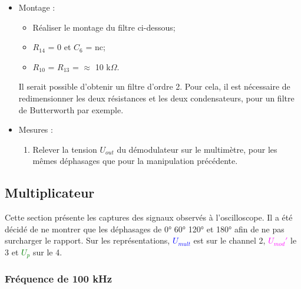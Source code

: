 \begin{itemize}
    \item Montage :
    \begin{itemize}
        \item Réaliser le montage du filtre ci-dessous;
        \item $R_{14}$ = 0 et $C_6$ = nc;
        \item $R_{10}$ = $R_{13}$ = $\approx$ 10 k$\Omega$.
    \end{itemize}

Il serait possible d'obtenir un filtre d'ordre 2. Pour cela, il est nécessaire de redimensionner les 
deux résistances et les deux condensateurs, pour un filtre de Butterworth par exemple.\\

    \item Mesures :
    \begin{enumerate}
        \item Relever la tension $U_{out}$ du démodulateur sur le multimètre, pour les mêmes déphasages
        que pour la manipulation précédente.
        
    \end{enumerate}
\end{itemize}

\subsection{Multiplicateur}

Cette section présente les captures des signaux observés à l'oscilloscope. Il a été décidé de
ne montrer que les déphasages de 0° 60° 120° et 180° afin de ne pas surcharger le rapport.
 Sur les représentations, \textcolor{blue}{$U_{mult}$} est sur le channel 2, 
 \textcolor{magenta}{$U_{mod}'$} le 3 et \textcolor{green}{$U_{p}$} sur le 4. 

\subsubsection{Fréquence de 100 kHz}




